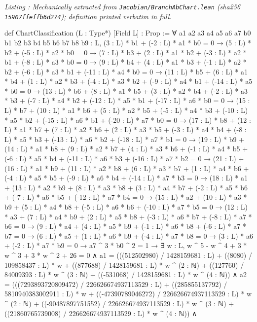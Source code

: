 \documentclass[a4paper,11pt]{article}
\newcounter{leanlisting}
\newenvironment{leanlisting}[2]{%
  \refstepcounter{leanlisting}\label{#2}%
  \begin{center}\textit{\small Listing \theleanlisting: #1}\end{center}%
  \Verbatim[breaklines=true,breakanywhere=true,fontsize=\footnotesize,frame=single,framesep=4pt,rulecolor=\color{gray!50},fillcolor=\color{gray!5}]%
}{%
  \endVerbatim%
}
\theoremstyle{plain}
\theoremstyle{definition}
\theoremstyle{remark}
\begin{document}
\begin{leanlisting}{Mechanically extracted from \texttt{Jacobian/BranchAbChart.lean} (sha256 \texttt{15907ffeffb6d274}); definition printed verbatim in full.}{lst:def-chartclass}
def ChartClassification (L : Type*) [Field L] : Prop :=
  ∀ a1 a2 a3 a4 a5 a6 a7 b0 b1 b2 b3 b4 b5 b6 b7 b8 b9 : L,
    (3 : L) * b1 + (-2 : L) * a1 * b0 = 0 →
    (5 : L) * b2 + (-5 : L) * a2 * b0 = 0 →
    (7 : L) * b3 + (2 : L) * a1 * b2 + (-3 : L) * a2 * b1 + (-8 : L) * a3 * b0 = 0 →
    (9 : L) * b4 + (4 : L) * a1 * b3 + (-1 : L) * a2 * b2 + (-6 : L) * a3 * b1 + (-11 : L) * a4 * b0 = 0 →
    (11 : L) * b5 + (6 : L) * a1 * b4 + (1 : L) * a2 * b3 + (-4 : L) * a3 * b2 + (-9 : L) * a4 * b1 + (-14 : L) * a5 * b0 = 0 →
    (13 : L) * b6 + (8 : L) * a1 * b5 + (3 : L) * a2 * b4 + (-2 : L) * a3 * b3 + (-7 : L) * a4 * b2 + (-12 : L) * a5 * b1 + (-17 : L) * a6 * b0 = 0 →
    (15 : L) * b7 + (10 : L) * a1 * b6 + (5 : L) * a2 * b5 + (-5 : L) * a4 * b3 + (-10 : L) * a5 * b2 + (-15 : L) * a6 * b1 + (-20 : L) * a7 * b0 = 0 →
    (17 : L) * b8 + (12 : L) * a1 * b7 + (7 : L) * a2 * b6 + (2 : L) * a3 * b5 + (-3 : L) * a4 * b4 + (-8 : L) * a5 * b3 + (-13 : L) * a6 * b2 + (-18 : L) * a7 * b1 = 0 →
    (19 : L) * b9 + (14 : L) * a1 * b8 + (9 : L) * a2 * b7 + (4 : L) * a3 * b6 + (-1 : L) * a4 * b5 + (-6 : L) * a5 * b4 + (-11 : L) * a6 * b3 + (-16 : L) * a7 * b2 = 0 →
    (21 : L) + (16 : L) * a1 * b9 + (11 : L) * a2 * b8 + (6 : L) * a3 * b7 + (1 : L) * a4 * b6 + (-4 : L) * a5 * b5 + (-9 : L) * a6 * b4 + (-14 : L) * a7 * b3 = 0 →
    (18 : L) * a1 + (13 : L) * a2 * b9 + (8 : L) * a3 * b8 + (3 : L) * a4 * b7 + (-2 : L) * a5 * b6 + (-7 : L) * a6 * b5 + (-12 : L) * a7 * b4 = 0 →
    (15 : L) * a2 + (10 : L) * a3 * b9 + (5 : L) * a4 * b8 + (-5 : L) * a6 * b6 + (-10 : L) * a7 * b5 = 0 →
    (12 : L) * a3 + (7 : L) * a4 * b9 + (2 : L) * a5 * b8 + (-3 : L) * a6 * b7 + (-8 : L) * a7 * b6 = 0 →
    (9 : L) * a4 + (4 : L) * a5 * b9 + (-1 : L) * a6 * b8 + (-6 : L) * a7 * b7 = 0 →
    (6 : L) * a5 + (1 : L) * a6 * b9 + (-4 : L) * a7 * b8 = 0 →
    (3 : L) * a6 + (-2 : L) * a7 * b9 = 0 →
    a7 ^ 3 * b0 ^ 2 = 1 →
    ∃ w : L, w ^ 5 - w ^ 4 + 3 * w ^ 3 + 3 * w ^ 2 + 26 = 0 ∧
      a1 = (((512502980) / 1428159681 : L) + ((8080) / 109858437 : L) * w + ((877688) / 1428159681 : L) * w ^ (2 : ℕ) + ((127760) / 84009393 : L) * w ^ (3 : ℕ) + ((-531068) / 1428159681 : L) * w ^ (4 : ℕ)) ∧
      a2 = (((7293893720809472) / 226626674937113529 : L) + ((285855137792) / 5810940383002911 : L) * w + ((-47390789046272) / 226626674937113529 : L) * w ^ (2 : ℕ) + ((-90487897751552) / 226626674937113529 : L) * w ^ (3 : ℕ) + ((21860765739008) / 226626674937113529 : L) * w ^ (4 : ℕ)) ∧

\end{leanlisting}
\end{document}
